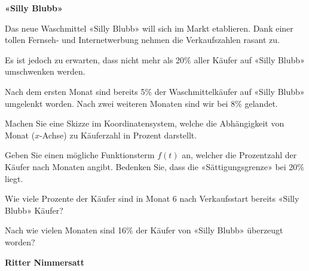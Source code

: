 \bbwActAufgabenNr{} \textbf{«Silly Blubb»}

Das neue Waschmittel «Silly Blubb» will sich im Markt etablieren.
Dank einer tollen Fernseh- und Internetwerbung nehmen die
Verkaufszahlen rasant zu.

Es ist jedoch zu erwarten, dass nicht mehr als 20\% aller Käufer auf
«Silly Blubb» umschwenken werden.

Nach dem ersten Monat sind bereits 5\% der Waschmittelkäufer auf
«Silly Blubb» umgelenkt worden. Nach zwei weiteren Monaten sind wir
bei 8\% gelandet.


\begin{bbwAufgabenBlock}
\item Machen Sie eine Skizze im Koordinatensystem, welche die
Abhängigkeit von Monat ($x$-Achse) zu Käuferzahl in Prozent darstellt.


\item Geben Sie einen mögliche Funktionsterm $f(t)$ an, welcher die
Prozentzahl der Käufer nach Monaten angibt. Bedenken Sie, dass die
«Sättigungsgrenze» bei 20\% liegt.


\item Wie viele Prozente der Käufer sind in Monat 6 nach Verkaufsstart
  bereits «Silly Blubb» Käufer?
  

\item Nach wie vielen Monaten sind 16\% der Käufer von «Silly Blubb»
  überzeugt worden?


\end{bbwAufgabenBlock}


\platzFuerBerechnungenBisEndeSeite{}



\bbwActAufgabenNr{} \textbf{Ritter Nimmersatt}

